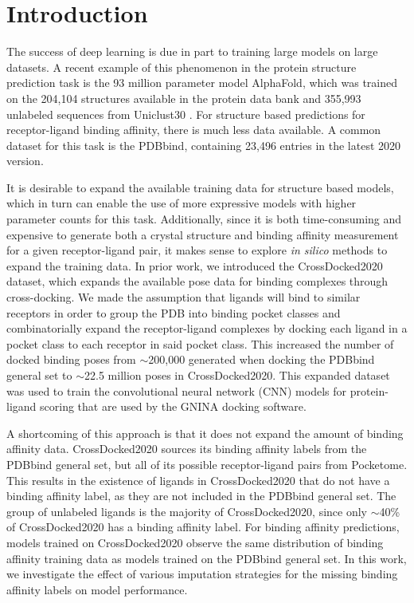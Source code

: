 \documentclass[journal=jmcmar,manuscript=article]{achemso}
\begin{document}

\section{Introduction}

The success of deep learning is due in part to training large models on large datasets.
A recent example of this phenomenon in the protein structure prediction task is the 93 million parameter model AlphaFold, which was trained on the 204,104 structures available in the protein data bank and 355,993 unlabeled sequences from Uniclust30 \cite{alphafold}.
For structure based predictions for receptor-ligand binding affinity, there is much less data available.
A common dataset for this task is the PDBbind,\cite{pdbbind2016} containing 23,496 entries in the latest 2020 version.

It is desirable to expand the available training data for structure based models, which in turn can enable the use of more expressive models with higher parameter counts for this task.
Additionally, since it is both time-consuming and expensive to generate both a crystal structure and binding affinity measurement for a given receptor-ligand pair, it makes sense to explore \textit{in silico} methods to expand the training data.
In prior work, we introduced the CrossDocked2020 dataset, which expands the available pose data for binding complexes through cross-docking\cite{crossdocked2020}.
We made the assumption that ligands will bind to similar receptors in order to group the PDB into binding pocket classes and combinatorially expand the receptor-ligand complexes by docking each ligand in a pocket class to each receptor in said pocket class.
This increased the number of docked binding poses from $\sim$200,000 generated when docking the PDBbind general set to $\sim$22.5 million poses in CrossDocked2020\cite{crossdocked2020}. This expanded dataset was used to train the convolutional neural network (CNN) models for protein-ligand scoring\cite{ragoza2017protein} that are used by the GNINA docking software.\cite{mcnutt2021gnina}

A shortcoming of this approach is that it does not expand the amount of binding affinity data.
CrossDocked2020 sources its binding affinity labels from the PDBbind general set, but all of its possible receptor-ligand pairs from Pocketome.\cite{pocketome}
This results in the existence of ligands in CrossDocked2020 that do not have a binding affinity label, as they are not included in the PDBbind general set.
The group of unlabeled ligands is the majority of CrossDocked2020, since only $\sim$40\% of CrossDocked2020 has a binding affinity label.
For binding affinity predictions, models trained on CrossDocked2020 observe the same distribution of binding affinity training data as models trained on the PDBbind general set.
In this work, we investigate the effect of various imputation strategies for the missing binding affinity labels on model performance.
\end{document}
